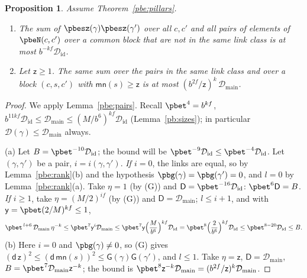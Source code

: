 \documentclass[10pt]{amsart}
\newtheorem{proposition}[theorem]{Proposition}
\theoremstyle{definition}
\theoremstyle{remark}
\providecommand{\pbDid}{\mathcal D_{\mathrm{id}}}
\providecommand{\pbDmain}{\mathcal D_{\mathrm{main}}}
\begin{document}
\begin{proposition}\label{pbe:two}
Assume Theorem~\ref{pbe:pillars}.
\begin{enumerate}
\item[(a)] The sum of $\pbesz(\gamma)\pbesz(\gamma')$ over all $c,c'$ and all pairs of elements of
$\pbeN(c,c')$ over a common block that are \emph{not} in the same link class is at most $b^{-kf}
\pbDid$.
\item[(b)] Let $\mathsf z\ge1$. The same sum over the pairs \emph{in} the same link class and over a
block $(c,s,c')$ with $\mathsf{mn}(s)\ge\mathsf z$ is at most $(b^{2f}/\mathsf z)^k\,\pbDmain$.
\end{enumerate}
\end{proposition}
\begin{proof}
We apply Lemma~\ref{pbe:pairs}. Recall $\pbet^4=b^{kf}$, $b^{11kf}\pbDid\le\pbDmain\le(M/b^6)^{kf}\pbDid$
(Lemma~\ref{pb:sizes}); in particular $\mathcal D(\gamma)\le\pbDmain$ always.

(a) Let $B=\pbet^{-10}\pbDid$; the bound will be $\pbet^{-9}\pbDid\le\pbet^{-4}\pbDid$. Let $(\gamma,
\gamma')$ be a pair, $i=i(\gamma,\gamma')$. \emph{If $i=0$}, the links are equal, so by
Lemma~\ref{pbe:rank}(b) and the hypothesis $\pbg(\gamma)=\pbg(\gamma')=0$, and $l=0$ by
Lemma~\ref{pbe:rank}(a). Take $\eta=1$ (by (G)) and $\mathsf D=\pbet^{-16}\pbDid$: $\pbet^6\mathsf D=B$.
\emph{If $i\ge1$}, take $\eta=(M/2)^{if}$ (by (G)) and $\mathsf D=\pbDmain$; $l\le i+1$, and with
$\mathsf y=\pbet(2/M)^{kf}\le1$,
\[
\pbet^{\,l+6}\,\pbDmain\,\eta^{-k}\le\pbet^7\mathsf y^i\pbDmain\le\pbet^7\mathsf y\Bigl(\frac M{b^6}
\Bigr)^{kf}\pbDid=\pbet^8\Bigl(\frac2{b^6}\Bigr)^{kf}\pbDid\le\pbet^{8-20}\pbDid\le B .
\]
(b) Here $i=0$ and $\pbg(\gamma)\ne0$, so (G) gives $(\mathsf d\,\mathsf z)^2\le(\mathsf d\,\mathsf{
mn}(s))^2\le\mathsf G(\gamma)\mathsf G(\gamma')$, and $l\le1$. Take $\eta=\mathsf z$, $\mathsf D=
\pbDmain$, $B=\pbet^7\pbDmain\mathsf z^{-k}$; the bound is $\pbet^8\mathsf z^{-k}\pbDmain=(b^{2f}/
\mathsf z)^k\pbDmain$.
\end{proof}
\end{document}
